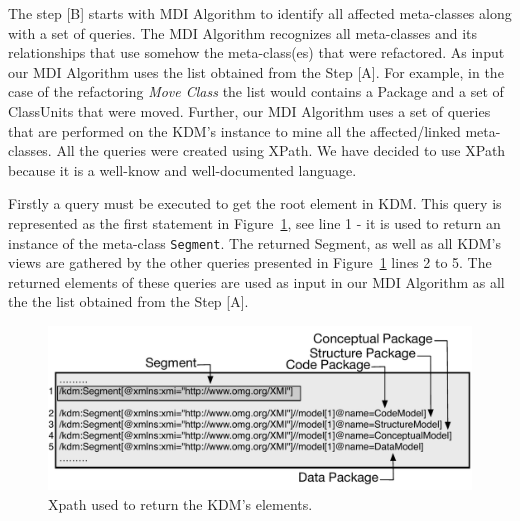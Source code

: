 The step [B] starts with MDI Algorithm to identify all affected meta-classes along with a set of queries. The MDI Algorithm recognizes all meta-classes and its relationships that use somehow the meta-class(es) that were refactored. As input our MDI Algorithm uses the list obtained from the Step [A]. For example, in the case of the refactoring \textit{Move Class} the list would contains a Package and a set of ClassUnits that were moved. Further, our MDI Algorithm uses a set of queries that are performed on the KDM's instance to mine all the affected/linked meta-classes. All the queries were created using XPath. We have decided to use XPath because it is a well-know and well-documented language. 


Firstly a query must be executed to get the root element in KDM. This query is represented as the first statement in Figure~\ref{fig:queriesXPath}, see line 1 - it is used to return an instance of the meta-class \texttt{Segment}. The returned Segment, as well as all KDM's views are gathered by the other queries presented in Figure~\ref{fig:queriesXPath} lines 2 to 5. The returned elements of these queries are used as input in our MDI Algorithm as all the the list obtained from the Step [A].

\begin{figure}[h]
	\centering
	\includegraphics[scale=0.479]{figuras/queiresANDATLSBESNew}
	\caption{Xpath used to return the KDM's elements.}
	\label{fig:queriesXPath}
\end{figure}



